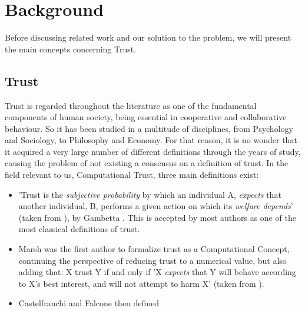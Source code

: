\section{Background}
\label{sec:Background}



Before discussing related work and our solution to the problem, we will present the main concepts concerning Trust.

\subsection{Trust}
\label{subsec:Trust}
Trust is regarded throughout the literature as one of the fundamental components of human society, being essential in cooperative and collaborative behaviour. So it has been studied in a multitude of disciplines, from Psychology and Sociology, to Philosophy and Economy\cite{Sabater2005}. For that reason, it is no wonder that it acquired a very large number of different definitions through the years of study, causing the problem of not existing a consensus on a definition of trust\cite{Castelfranchi2010}. In the field relevant to us, Computational Trust, three main definitions exist:
\begin{itemize}
	\item 'Trust is the \textit{subjective probability} by which an individual A, \textit{expects} that another individual, B, performs a given action on which its \textit{welfare depends}' (taken from \cite{Castelfranchi2010}), by Gambetta \cite{Gambetta2015}. This is accepted by most authors as one of the most classical definitions of trust.
	
	\item Marsh was the first author to formalize trust as a Computational Concept\cite{Marsh1994}, continuing the perspective of reducing trust to a numerical value, but also adding that: X trust Y if and only if 'X \textit{expects} that Y will behave according to X's best interest, and will not attempt to harm X' (taken from \cite{Castelfranchi2010}).
	
	\item Castelfranchi and Falcone then defined 
\end{itemize}